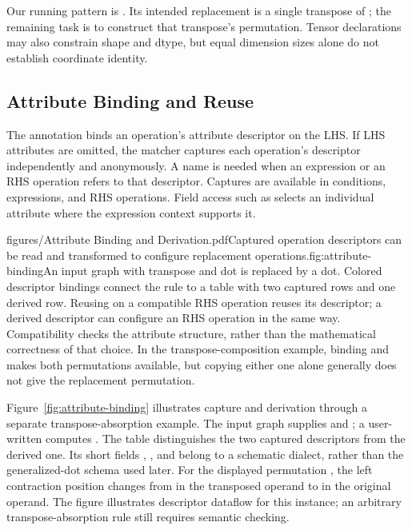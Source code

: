 Our running pattern is
.
Its intended replacement is a single transpose of ; the remaining
task is to construct that transpose's permutation. Tensor declarations may
also constrain shape and dtype, but equal dimension sizes alone do not
establish coordinate identity.

\FloatBarrier
\subsection{Attribute Binding and Reuse}
\label{sec:binding}
The annotation  binds an operation's attribute descriptor on
the LHS. If LHS attributes are omitted, the matcher captures each operation's
descriptor independently and anonymously. A name is needed when an expression
or an RHS operation refers to that descriptor. Captures are available in
 conditions,  expressions, and RHS operations.
Field access such as  selects an individual
attribute where the expression context supports it.

\begin{figuretext}{figures/Attribute Binding and Derivation.pdf}{Captured operation descriptors can be read and transformed to configure replacement operations.}{fig:attribute-binding}{An input graph with transpose and dot is replaced by a dot. Colored descriptor
bindings connect the rule to a table with two captured rows and one derived row.}
Reusing  on a compatible RHS operation reuses its descriptor;
a derived descriptor can configure an RHS operation in the same way.
Compatibility checks the attribute structure, rather than the mathematical
correctness of that choice. In the transpose-composition example, binding
 and  makes both permutations available, but copying
either one alone generally does not give the replacement permutation.

Figure~\ref{fig:attribute-binding} illustrates capture and derivation through
a separate transpose-absorption example. The input graph supplies 
and ; a user-written  computes .
The table distinguishes the two captured descriptors from the derived one.
Its short fields , , and  belong to a
schematic dialect, rather than the generalized-dot schema used later.
For the displayed permutation \code{[1,0,2]}, the left contraction position
changes from  in the transposed operand to  in the original
operand. The figure illustrates descriptor dataflow for this instance; an
arbitrary transpose-absorption rule still requires semantic checking.
\end{figuretext}

